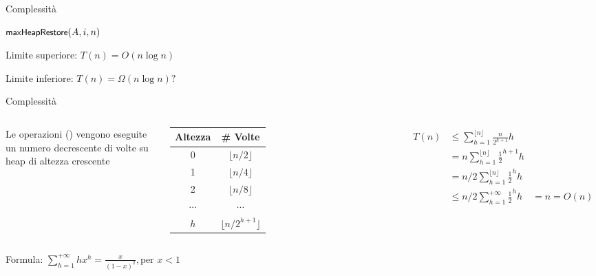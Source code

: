 \begin{frame}{Complessità}

\begin{Procedure}
\caption[A]{\heapbuild($\Item[\,]\ A$, \INTEGER $n$)}
\label{alg:heapbuild}

{
  $\textsf{{\small maxHeapRestore}}(A, i, n)$\;
}
\end{Procedure}

\pause
\BIL
\item Limite superiore: \pause $T(n) = O(n \log n)$
\item Limite inferiore: \pause $T(n) = \Omega(n \log n)?$
\EIL
\end{frame}
    
\begin{frame}{Complessità}
    
\vspace{-6pt}
\begin{columns}[T]
Le operazioni \maxheapify() vengono eseguite un numero
decrescente di volte su heap di altezza crescente

\medskip
\begin{tabular}{|c|c|}
\hline
\textbf{Altezza} & \textbf{\# Volte} \\\hline
0 & $\lfloor n/2\rfloor$ \\\hline
1 & $\lfloor n/4\rfloor$ \\\hline
2 & $\lfloor n/8\rfloor$ \\\hline
$\cdots$ & $\cdots$ \\\hline
$h$ & $\lfloor n/2^{h+1}\rfloor$ \\\hline
\end{tabular}
\begin{align*}
T(n) &\leq \sum_{h=1}^{\lfloor n \rfloor} \frac{n}{2^{h+1}}h \\
     &= n\sum_{h=1}^{\lfloor n \rfloor} \frac{1}{2}^{h+1}h \\
     &= n/2 \sum_{h=1}^{\lfloor n \rfloor} \frac{1}{2}^{h}h \\
     &\leq n/2 \sum_{h=1}^{+\infty} \frac{1}{2}^{h}h 
     & = n = O(n)\\
\end{align*}
\end{columns}

\vspace{-12pt}
Formula: $\displaystyle \sum_{h=1}^{+\infty} hx^h = \frac{x}{(1-x)^2}, \textrm{per $x<1$}$

\end{frame}

